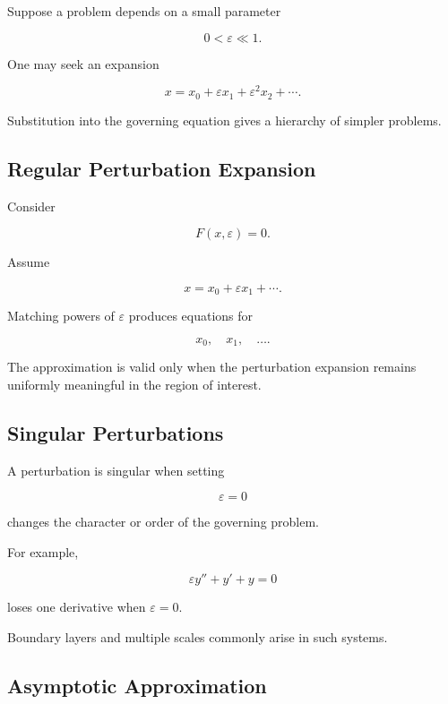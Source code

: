 Suppose a problem depends on a small parameter

\[
0<\varepsilon\ll1.
\]

One may seek an expansion

\[
\boxed{
x
=
x_0
+
\varepsilon x_1
+
\varepsilon^2x_2
+
\cdots.
}
\]

Substitution into the governing equation gives a hierarchy of simpler
problems.

\subsection{Regular Perturbation Expansion}
\label{subsec:regular-perturbation}

Consider

\[
F(x,\varepsilon)=0.
\]

Assume

\[
x=x_0+\varepsilon x_1+\cdots.
\]

Matching powers of \(\varepsilon\) produces equations for

\[
x_0,
\quad
x_1,
\quad
\ldots.
\]

The approximation is valid only when the perturbation expansion remains
uniformly meaningful in the region of interest.

\subsection{Singular Perturbations}
\label{subsec:singular-perturbations-physics}

A perturbation is singular when setting

\[
\varepsilon=0
\]

changes the character or order of the governing problem.

For example,

\[
\boxed{
\varepsilon y''
+
y'
+
y
=
0
}
\]

loses one derivative when \(\varepsilon=0\).

Boundary layers and multiple scales commonly arise in such systems.

\subsection{Asymptotic Approximation}
\label{subsec:physical-asymptotics}

